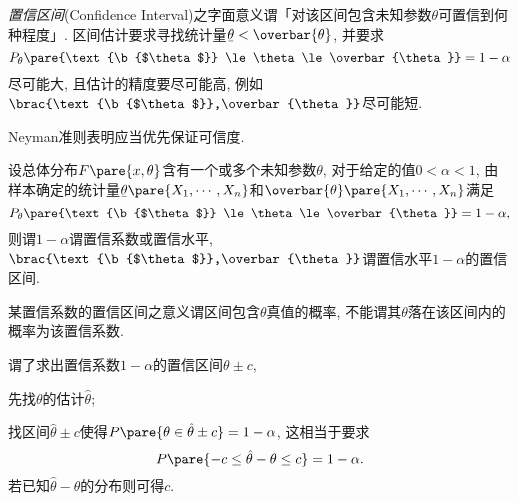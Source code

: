 \documentclass{ctexart}
\newcommand{\ubar}[1]{\text{\b{$#1$}}}
\begin{document}
\emph{置信区间}(Confidence Interval)之字面意义谓「对该区间包含未知参数$\theta$可置信到何种程度」. 区间估计要求寻找统计量$\ubar{\theta}<\overbar{\theta}$, 并要求
\[ P_\theta\pare{\ubar{\theta} \le \theta \le \overbar{\theta}} = 1-\alpha \]
尽可能大, 且估计的精度要尽可能高, 例如$\brac{\ubar{\theta},\overbar{\theta}}$尽可能短.
\begin{remark}
    Neyman准则表明应当优先保证可信度.
\end{remark}
\begin{definition}
    设总体分布$F\pare{x,\theta}$含有一个或多个未知参数$\theta$, 对于给定的值$0<\alpha<1$, 由样本确定的统计量$\ubar{\theta}\pare{X_1,\cdots,X_n}$和$\overbar{\theta}\pare{X_1,\cdots,X_n}$满足
    \[ P_\theta\pare{\ubar{\theta} \le \theta \le \overbar{\theta}} = 1-\alpha, \]
    则谓$1-\alpha$谓置信系数或置信水平, $\brac{\ubar{\theta},\overbar{\theta}}$谓置信水平$1-\alpha$的置信区间.
\end{definition}
\begin{remark}
    某置信系数的置信区间之意义谓区间包含$\theta$真值的概率, 不能谓其$\theta$落在该区间内的概率为该置信系数.
\end{remark}
谓了求出置信系数$1-\alpha$的置信区间$\theta\pm c$,
\begin{cenum}
    \item 先找$\theta$的估计$\hat\theta$;
    \item 找区间$\hat\theta\pm c$使得$P\pare{\theta\in\hat\theta\pm c} = 1-\alpha$, 这相当于要求
    \[ P\pare{-c \le \hat\theta - \theta \le c} = 1-\alpha. \]
    若已知$\hat\theta - \theta$的分布则可得$c$.
\end{cenum}
\end{document}
